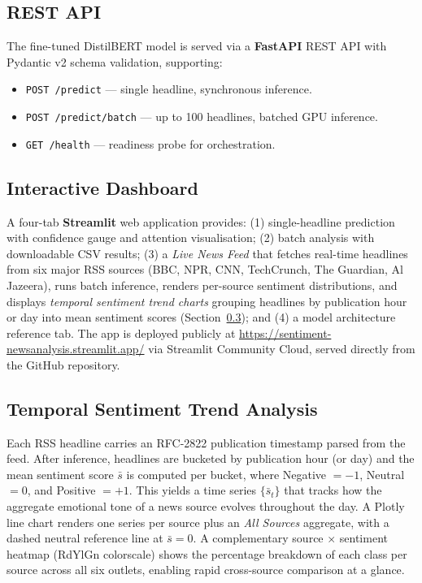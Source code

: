 \documentclass[conference]{IEEEtran}
\begin{document}
\subsection{REST API}
The fine-tuned DistilBERT model is served via a \textbf{FastAPI}
\cite{fastapi} REST API with Pydantic v2 schema validation, supporting:
\begin{itemize}
  \item \texttt{POST /predict} — single headline, synchronous inference.
  \item \texttt{POST /predict/batch} — up to 100 headlines, batched
        GPU inference.
  \item \texttt{GET /health} — readiness probe for orchestration.
\end{itemize}

\subsection{Interactive Dashboard}
A four-tab \textbf{Streamlit} web application provides:
(1) single-headline prediction with confidence gauge and attention
visualisation; (2) batch analysis with downloadable CSV results;
(3) a \textit{Live News Feed} that fetches real-time headlines from
six major RSS sources (BBC, NPR, CNN, TechCrunch, The Guardian,
Al Jazeera), runs batch inference, renders per-source
sentiment distributions, and displays \textit{temporal sentiment trend charts}
grouping headlines by publication hour or day into mean sentiment
scores (Section~\ref{subsec:trend}); and (4) a model architecture
reference tab. The app is deployed publicly at
\url{https://sentiment-newsanalysis.streamlit.app/} via Streamlit
Community Cloud, served directly from the GitHub repository.

\subsection{Temporal Sentiment Trend Analysis}
\label{subsec:trend}
Each RSS headline carries an RFC-2822 publication timestamp parsed
from the feed. After inference, headlines are bucketed by publication
hour (or day) and the mean sentiment score $\bar{s}$ is computed per
bucket, where Negative $= -1$, Neutral $= 0$, and Positive $= +1$.
This yields a time series $\{\bar{s}_t\}$ that tracks how the
aggregate emotional tone of a news source evolves throughout the day.
A Plotly line chart renders one series per source plus an
\textit{All Sources} aggregate, with a dashed neutral reference line
at $\bar{s} = 0$. A complementary source $\times$ sentiment heatmap
(RdYlGn colorscale) shows the percentage breakdown of each class per
source across all six outlets, enabling rapid cross-source
comparison at a glance.
\end{document}
